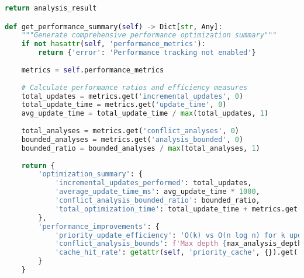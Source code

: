 \begin{lstlisting}[language=Python, caption=Complexity Optimization Implementations]
    return analysis_result

def get_performance_summary(self) -> Dict[str, Any]:
    """Generate comprehensive performance optimization summary"""
    if not hasattr(self, 'performance_metrics'):
        return {'error': 'Performance tracking not enabled'}
    
    metrics = self.performance_metrics
    
    # Calculate performance ratios and efficiency measures
    total_updates = metrics.get('incremental_updates', 0)
    total_update_time = metrics.get('update_time', 0)
    avg_update_time = total_update_time / max(total_updates, 1)
    
    total_analyses = metrics.get('conflict_analyses', 0)
    bounded_analyses = metrics.get('analysis_bounded', 0)
    bounded_ratio = bounded_analyses / max(total_analyses, 1)
    
    return {
        'optimization_summary': {
            'incremental_updates_performed': total_updates,
            'average_update_time_ms': avg_update_time * 1000,
            'conflict_analysis_bounded_ratio': bounded_ratio,
            'total_optimization_time': total_update_time + metrics.get('analysis_time', 0)
        },
        'performance_improvements': {
            'priority_update_efficiency': 'O(k) vs O(n log n) for k updates',
            'conflict_analysis_bounds': f'Max depth {max_analysis_depth} prevents exponential cases',
            'cache_hit_rate': getattr(self, 'priority_cache', {}).get('hit_rate', 0) if hasattr(self, 'priority_cache') else 0
        }
    }
\end{lstlisting}